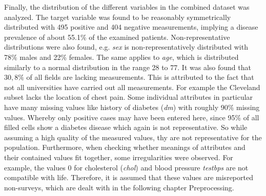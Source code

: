 Finally, the distribution of the different variables in the combined dataset was analyzed. The target variable was found to be reasonably symmetrically distributed with 495 positive and 404 negative measurements, implying a disease prevalence of about 55.1\% of the examined patients. Non-representative distributions were also found, e.g. \textit{sex} is non-representatively distributed with 78\% males and 22\% females. The same applies to \textit{age}, which is distributed similarly to a normal distribution in the range 28 to 77. It was also found that $30,8\%$ of all fields are lacking measurements. This is attributed to the fact that not all universities have carried out all measurements. For example the Cleveland subset lacks the location of chest pain. Some individual attributes in particular have many missing values like history of diabetes (\textit{dm}) with roughly 90\% missing values. Whereby only positive cases may have been entered here, since 95\% of all filled cells show a diabetes disease which again is not representative. So while assuming a high quality of the measured values, thy are not representative for the population. Furthermore, when checking whether meanings of attributes and their contained values fit together, some irregularities were observed. For example, the values 0 for cholesterol (\textit{chol}) and blood pressure \textit{testbps} are not compatible with life. Therefore, it is assumed that these values are misreported non-surveys, which are dealt with in the following chapter Preprocessing. 
